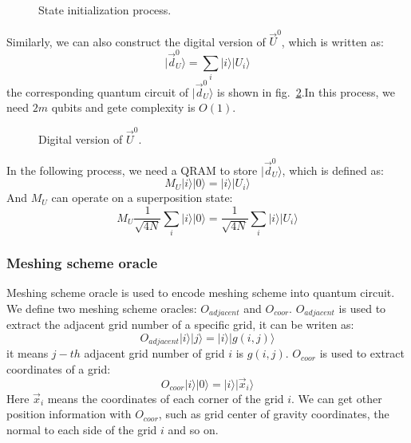 \documentclass[%
 reprint,
 amsmath,amssymb,
pra,
]{revtex4-1}
\begin{document}
\begin{itemize}
\begin{figure}[htbp]
    \caption{State initialization process.  }
    \label{state_initialization}
\end{figure}
Similarly, we can also construct the digital version of $\vec{U}^0$, which is written as:
$$
|\vec{d}_U^0\rangle=\sum_i{|i\rangle|U_i\rangle}
$$
the corresponding quantum circuit of $|\vec{d}_U^0\rangle$ is shown in fig.~\ref{digit_state_initialization}.In this process, we need $2m$ qubits and gete complexity is $O(1)$.

\begin{figure}[htbp]
    \caption{Digital version of $\vec{U}^0$. }
    \label{digit_state_initialization}
\end{figure}

In the following process, we need a QRAM to store $|\vec{d}_U^0\rangle$, which is defined as:
$$
M_U|i\rangle|0\rangle=|i\rangle|U_i\rangle
$$
And $M_U$ can operate on a superposition state:
$$
M_U\frac{1}{\sqrt{4N}}\sum_i{|i\rangle|0\rangle}=\frac{1}{\sqrt{4N}}\sum_i{|i\rangle|U_i\rangle}
$$

\subsubsection{Meshing scheme oracle}

Meshing scheme oracle is used to encode meshing scheme into quantum circuit. We define two meshing scheme oracles: $O_{adjacent}$ and $O_{coor}$. $O_{adjacent}$ is used to extract the adjacent grid number of a specific grid, it can be writen as:
$$
O_{adjacent}|i\rangle|j\rangle=|i\rangle|g(i,j)\rangle
$$
it means $j-th$ adjacent grid number of grid $i$ is $g(i,j)$. $O_{coor}$ is used to extract coordinates of a grid:
$$
O_{coor}|i\rangle|0\rangle=|i\rangle|\vec{x}_i\rangle
$$
Here $\vec{x}_i$ means the coordinates of each corner of the grid $i$. We can get other position information with $O_{coor}$, such as grid center of gravity coordinates, the normal to each side of the grid $i$ and so on.


\end{itemize}
\end{document}
